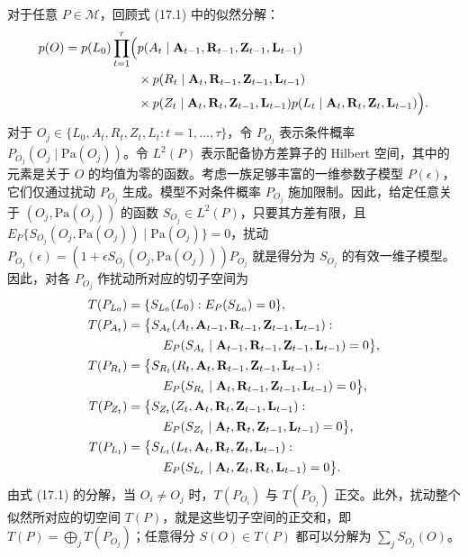 对于任意 $P\in\mathcal M$，回顾式 (17.1) 中的似然分解：
\[
\begin{aligned}
p(O)=p(L_0)\prod_{t=1}^\tau\Bigl(
 &p(A_t\mid\mathbf A_{t-1},\mathbf R_{t-1},\mathbf Z_{t-1},\mathbf L_{t-1})\\
&\times p(R_t\mid\mathbf A_t,\mathbf R_{t-1},\mathbf Z_{t-1},\mathbf L_{t-1})\\
&\times p(Z_t\mid\mathbf A_t,\mathbf R_t,\mathbf Z_{t-1},\mathbf L_{t-1})
 p(L_t\mid\mathbf A_t,\mathbf R_t,\mathbf Z_t,\mathbf L_{t-1})\Bigr).
\end{aligned}
\]
对于 $O_j\in\{L_0,A_t,R_t,Z_t,L_t:t=1,\ldots,\tau\}$，令 $P_{O_j}$ 表示条件概率 $P_{O_j}(O_j\mid\mathrm{Pa}(O_j))$。令 $L^2(P)$ 表示配备协方差算子的 Hilbert 空间，其中的元素是关于 $O$ 的均值为零的函数。考虑一族足够丰富的一维参数子模型 $P(\epsilon)$，它们仅通过扰动 $P_{O_j}$ 生成。模型不对条件概率 $P_{O_j}$ 施加限制。因此，给定任意关于 $(O_j,\mathrm{Pa}(O_j))$ 的函数 $S_{O_j}\in L^2(P)$，只要其方差有限，且
$E_P\{S_{O_j}(O_j,\mathrm{Pa}(O_j))\mid\mathrm{Pa}(O_j)\}=0$，扰动
$P_{O_j}(\epsilon)=(1+\epsilon S_{O_j}(O_j,\mathrm{Pa}(O_j)))P_{O_j}$
就是得分为 $S_{O_j}$ 的有效一维子模型。因此，对各 $P_{O_j}$ 作扰动所对应的切子空间为
\begingroup\small
\[
\begin{aligned}
T(P_{L_0})={}&\{S_{L_0}(L_0):E_P(S_{L_0})=0\},\\
T(P_{A_t})={}&\bigl\{S_{A_t}(A_t,\mathbf A_{t-1},\mathbf R_{t-1},\mathbf Z_{t-1},\mathbf L_{t-1}):\\
&\hspace{1.5em}E_P(S_{A_t}\mid\mathbf A_{t-1},\mathbf R_{t-1},\mathbf Z_{t-1},\mathbf L_{t-1})=0\bigr\},\\
T(P_{R_t})={}&\bigl\{S_{R_t}(R_t,\mathbf A_t,\mathbf R_{t-1},\mathbf Z_{t-1},\mathbf L_{t-1}):\\
&\hspace{1.5em}E_P(S_{R_t}\mid\mathbf A_t,\mathbf R_{t-1},\mathbf Z_{t-1},\mathbf L_{t-1})=0\bigr\},\\
T(P_{Z_t})={}&\bigl\{S_{Z_t}(Z_t,\mathbf A_t,\mathbf R_t,\mathbf Z_{t-1},\mathbf L_{t-1}):\\
&\hspace{1.5em}E_P(S_{Z_t}\mid\mathbf A_t,\mathbf R_t,\mathbf Z_{t-1},\mathbf L_{t-1})=0\bigr\},\\
T(P_{L_t})={}&\bigl\{S_{L_t}(L_t,\mathbf A_t,\mathbf R_t,\mathbf Z_t,\mathbf L_{t-1}):\\
&\hspace{1.5em}E_P(S_{L_t}\mid\mathbf A_t,\mathbf Z_t,\mathbf R_t,\mathbf L_{t-1})=0\bigr\}.
\end{aligned}
\]
\endgroup
由式 (17.1) 的分解，当 $O_i\ne O_j$ 时，$T(P_{O_i})$ 与 $T(P_{O_j})$ 正交。此外，扰动整个似然所对应的切空间 $T(P)$，就是这些切子空间的正交和，即 $T(P)=\bigoplus_jT(P_{O_j})$；任意得分 $S(O)\in T(P)$ 都可以分解为 $\sum_jS_{O_j}(O)$。

